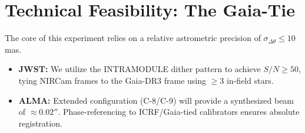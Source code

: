 \documentclass[11pt, a4paper]{article}
\begin{document}
\section{Technical Feasibility: The Gaia-Tie}
The core of this experiment relies on a relative astrometric precision of $\sigma_{\Delta\theta} \leq 10$ mas. 
\begin{itemize}
    \item \textbf{JWST:} We utilize the INTRAMODULE dither pattern to achieve $S/N \geq 50$, tying NIRCam frames to the Gaia-DR3 frame using $\geq 3$ in-field stars. 
    \item \textbf{ALMA:} Extended configuration (C-8/C-9) will provide a synthesized beam of $\approx 0.02''$. Phase-referencing to ICRF/Gaia-tied calibrators ensures absolute registration.
\end{itemize}
\end{document}
